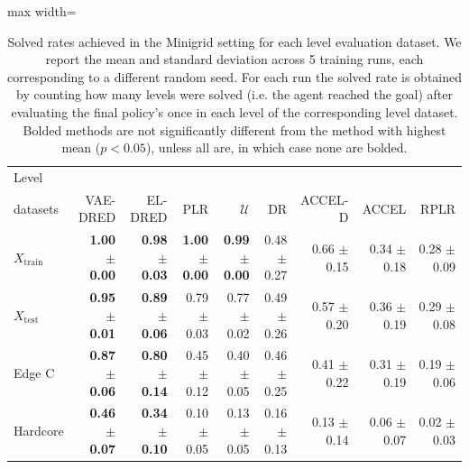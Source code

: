 \begin{table}[H]
\caption{Solved rates achieved in the Minigrid setting for each level evaluation dataset. We report the mean and standard deviation across 5 training runs, each corresponding to a different random seed. For each run the solved rate is obtained by counting how many levels were solved (i.e. the agent reached the goal) after evaluating the final policy’s once in each level of the corresponding level dataset. Bolded methods are not significantly different from the method with highest mean ($p<0.05$), unless all are, in which case none are bolded.}
\label{c3:tb:minigrid_solved_rate}
\vskip 0.15in
\begin{center}
\begin{small}
\begin{sc}
\tabcolsep=0.11cm
\begin{adjustbox}{max width=\linewidth}
\begin{tabular}{lrrrrrrrr}
\toprule
      Level\\ datasets &                 VAE-DRED &                  EL-DRED &                      PLR &            $\mathcal{U}$ &              DR &         ACCEL-D &           ACCEL &            RPLR \\
\midrule
$X_{\mathrm{train}}$ & \textbf{1.00 $\pm$ 0.00} & \textbf{0.98 $\pm$ 0.03} & \textbf{1.00 $\pm$ 0.00} & \textbf{0.99 $\pm$ 0.00} & 0.48 $\pm$ 0.27 & 0.66 $\pm$ 0.15 & 0.34 $\pm$ 0.18 & 0.28 $\pm$ 0.09 \\
 $X_{\mathrm{test}}$ & \textbf{0.95 $\pm$ 0.01} & \textbf{0.89 $\pm$ 0.06} &          0.79 $\pm$ 0.03 &          0.77 $\pm$ 0.02 & 0.49 $\pm$ 0.26 & 0.57 $\pm$ 0.20 & 0.36 $\pm$ 0.19 & 0.29 $\pm$ 0.08 \\
              Edge C & \textbf{0.87 $\pm$ 0.06} & \textbf{0.80 $\pm$ 0.14} &          0.45 $\pm$ 0.12 &          0.40 $\pm$ 0.05 & 0.46 $\pm$ 0.25 & 0.41 $\pm$ 0.22 & 0.31 $\pm$ 0.19 & 0.19 $\pm$ 0.06 \\
            Hardcore & \textbf{0.46 $\pm$ 0.07} & \textbf{0.34 $\pm$ 0.10} &          0.10 $\pm$ 0.05 &          0.13 $\pm$ 0.05 & 0.16 $\pm$ 0.13 & 0.13 $\pm$ 0.14 & 0.06 $\pm$ 0.07 & 0.02 $\pm$ 0.03 \\
\bottomrule
\end{tabular}
\end{adjustbox}
\end{sc}
\end{small}
\end{center}
\vskip -0.1in
\end{table}


